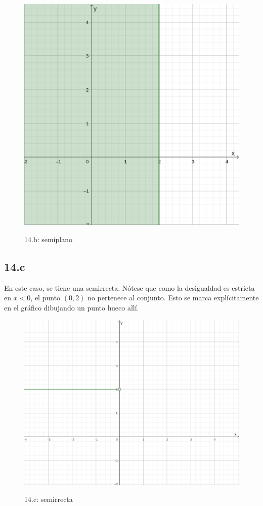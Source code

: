 \documentclass{article}
\begin{document}
\begin{figure}[ht]
\caption{14.b: semiplano}
\includegraphics[scale=0.9]{../../common/sb_28/ex_00/ex_14b.png} 
\centering
\label{fig:14b}
\end{figure}

\subsection*{14.c}
\label{subsec:14.c}

En este caso, se tiene una semirrecta. Nótese que como la desigualdad es estricta en $x < 0$, el punto $(0, 2)$ no pertenece al conjunto. Esto se marca explícitamente en el gráfico dibujando un punto hueco allí.

\begin{figure}[ht]
\caption{14.c: semirrecta}
\includegraphics[scale=0.9]{../../common/sb_28/ex_00/ex_14c.png} 
\centering
\label{fig:14c}
\end{figure}
\end{document}
